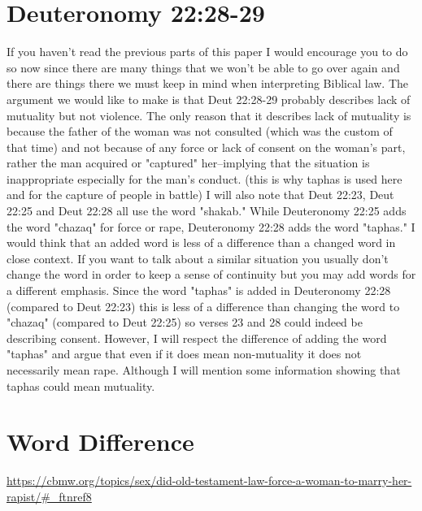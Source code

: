 \documentclass[11pt]{article}
\begin{document}
\section{Deuteronomy 22:28-29}
If you haven't read the previous parts of this paper I would encourage you to do so now since there are many things that we won't be able to go over again and there are things there we must keep in mind when interpreting Biblical law. The argument we would like to make is that Deut 22:28-29 probably describes lack of mutuality but not violence. The only reason that it describes lack of mutuality is because the father of the woman was not consulted (which was the custom of that time) and not because of any force or lack of consent on the woman's part, rather the man acquired or "captured" her--implying that the situation is inappropriate especially for the man's conduct. (this is why taphas is used here and for the capture of people in battle) I will also note that Deut 22:23, Deut 22:25 and Deut 22:28 all use the word "shakab." While Deuteronomy 22:25 adds the word "chazaq" for force or rape, Deuteronomy 22:28 adds the word "taphas." I would think that an added word is less of a difference than a changed word in close context. If you want to talk about a similar situation you usually don't change the word in order to keep a sense of continuity but you may add words for a different emphasis. Since the word "taphas" is added in Deuteronomy 22:28 (compared to Deut 22:23) this is less of a difference than changing the word to "chazaq" (compared to Deut 22:25) so verses 23 and 28 could indeed be describing consent. However, I will respect the difference of adding the word "taphas" and argue that even if it does mean non-mutuality it does not necessarily mean rape. Although I will mention some information showing that taphas could mean mutuality.

\section{Word Difference}

\url{https://cbmw.org/topics/sex/did-old-testament-law-force-a-woman-to-marry-her-rapist/#_ftnref8}
\end{document}
